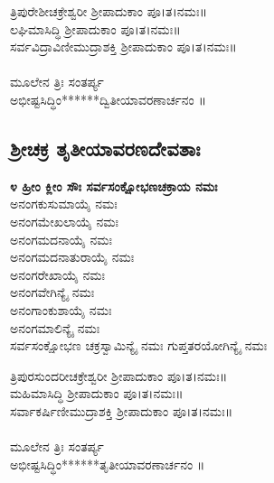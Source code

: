  ತ್ರಿಪುರೇಶೀಚಕ್ರೇಶ್ವರೀ ಶ್ರೀಪಾದುಕಾಂ ಪೂ।ತ।ನಮಃ॥\\
 ಲಘಿಮಾಸಿದ್ಧಿ ಶ್ರೀಪಾದುಕಾಂ ಪೂ।ತ।ನಮಃ॥\\
 ಸರ್ವವಿದ್ರಾವಿಣೀಮುದ್ರಾಶಕ್ತಿ ಶ್ರೀಪಾದುಕಾಂ ಪೂ।ತ।ನಮಃ॥\\
\\
ಮೂಲೇನ ತ್ರಿಃ ಸಂತರ್ಪ್ಯ\\
 ಅಭೀಷ್ಟಸಿದ್ಧಿಂ******ದ್ವಿತೀಯಾವರಣಾರ್ಚನಂ ॥
\subsection{ಶ್ರೀಚಕ್ರ ತೃತೀಯಾವರಣದೇವತಾಃ}
{\bfseries ೪ ಹ್ರೀಂ ಕ್ಲೀಂ ಸೌಃ ಸರ್ವಸಂಕ್ಷೋಭಣಚಕ್ರಾಯ ನಮಃ}\\
 ಅನಂಗಕುಸುಮಾಯೈ ನಮಃ\\
 ಅನಂಗಮೇಖಲಾಯೈ ನಮಃ\\
 ಅನಂಗಮದನಾಯೈ ನಮಃ\\
 ಅನಂಗಮದನಾತುರಾಯೈ ನಮಃ\\
 ಅನಂಗರೇಖಾಯೈ ನಮಃ\\
 ಅನಂಗವೇಗಿನ್ಯೈ ನಮಃ\\
 ಅನಂಗಾಂಕುಶಾಯೈ ನಮಃ\\
 ಅನಂಗಮಾಲಿನ್ಯೈ ನಮಃ\\
 ಸರ್ವಸಂಕ್ಷೋಭಣ ಚಕ್ರಸ್ವಾಮಿನ್ಯೈ ನಮಃ
ಗುಪ್ತತರಯೋಗಿನ್ಯೈ ನಮಃ

 ತ್ರಿಪುರಸುಂದರೀಚಕ್ರೇಶ್ವರೀ ಶ್ರೀಪಾದುಕಾಂ ಪೂ।ತ।ನಮಃ॥\\
 ಮಹಿಮಾಸಿದ್ಧಿ ಶ್ರೀಪಾದುಕಾಂ ಪೂ।ತ।ನಮಃ॥\\
 ಸರ್ವಾಕರ್ಷಿಣೀಮುದ್ರಾಶಕ್ತಿ ಶ್ರೀಪಾದುಕಾಂ ಪೂ।ತ।ನಮಃ॥\\
\\
ಮೂಲೇನ ತ್ರಿಃ ಸಂತರ್ಪ್ಯ\\
 ಅಭೀಷ್ಟಸಿದ್ಧಿಂ******ತೃತೀಯಾವರಣಾರ್ಚನಂ ॥
